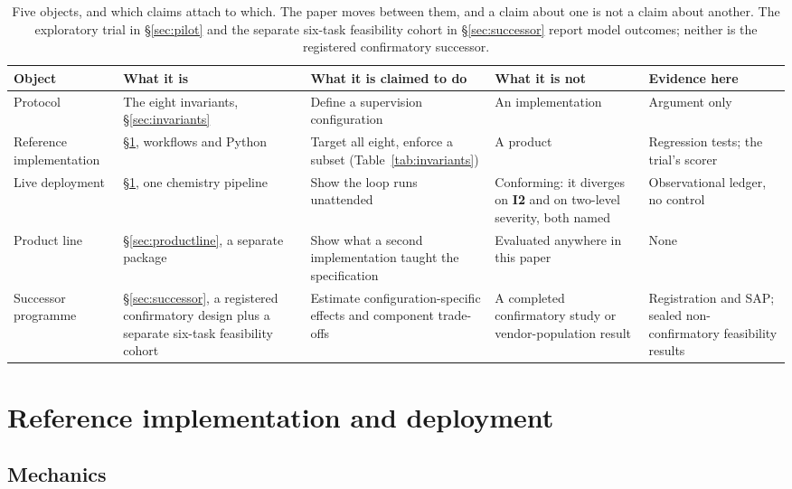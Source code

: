 \documentclass[11pt]{article}
\newcommand{\invariant}[1]{\textbf{I#1}}
\begin{document}
\begin{table}[t]
\centering\footnotesize\setlength{\tabcolsep}{4pt}
\caption{Five objects, and which claims attach to which. The paper moves between them, and a claim about one is not a claim about another. The exploratory trial in \S\ref{sec:pilot} and the separate six-task feasibility cohort in \S\ref{sec:successor} report model outcomes; neither is the registered confirmatory successor.}
\label{tab:objects}
\begin{tabular}{@{}p{22mm}p{34mm}p{34mm}p{34mm}p{22mm}@{}}
\toprule
Object & What it is & What it is claimed to do & What it is not & Evidence here \\
\midrule
Protocol & The eight invariants, \S\ref{sec:invariants} & Define a supervision configuration & An implementation & Argument only \\
Reference implementation & \S\ref{sec:implementation}, workflows and Python & Target all eight, enforce a subset (Table~\ref{tab:invariants}) & A product & Regression tests; the trial's scorer \\
Live deployment & \S\ref{sec:implementation}, one chemistry pipeline & Show the loop runs unattended & Conforming: it diverges on \invariant{2} and on two-level severity, both named & Observational ledger, no control \\
Product line & \S\ref{sec:productline}, a separate package & Show what a second implementation taught the specification & Evaluated anywhere in this paper & None \\
Successor programme & \S\ref{sec:successor}, a registered confirmatory design plus a separate six-task feasibility cohort & Estimate configuration-specific effects and component trade-offs & A completed confirmatory study or vendor-population result & Registration and SAP; sealed non-confirmatory feasibility results \\
\bottomrule
\end{tabular}
\end{table}

\section{Reference implementation and deployment}\label{sec:implementation}

\subsection{Mechanics}
\end{document}
